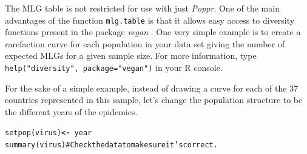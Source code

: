 \documentclass[letterpaper]{article}\usepackage[]{graphicx}\usepackage[]{color}
\makeatletter
\newcommand{\hlcom}[1]{\textcolor[rgb]{1,0.502,0}{#1}}%
\newcommand{\hlopt}[1]{\textcolor[rgb]{1,0,0.502}{\textbf{#1}}}%
\newcommand{\hlstd}[1]{\textcolor[rgb]{0,0,0}{#1}}%
\newcommand{\hlkwb}[1]{\textcolor[rgb]{0.502,0.502,0.753}{\textbf{#1}}}%
\newcommand{\hlkwd}[1]{\textcolor[rgb]{0,0.267,0.4}{#1}}%
\newenvironment{kframe}{%
 \def\at@end@of@kframe{}%
 \ifinner\ifhmode%
  \def\at@end@of@kframe{\end{minipage}}%
  \begin{minipage}{\columnwidth}%
 \fi\fi%
 \def\FrameCommand##1{\hskip\@totalleftmargin \hskip-\fboxsep
 \colorbox{shadecolor}{##1}\hskip-\fboxsep
     \hskip-\linewidth \hskip-\@totalleftmargin \hskip\columnwidth}%
 \MakeFramed {\advance\hsize-\width
   \@totalleftmargin\z@ \linewidth\hsize
   \@setminipage}}%
 {\par\unskip\endMakeFramed%
 \at@end@of@kframe}
\newenvironment{knitrout}{}{} %
\newcommand{\Poppr}{\textit{Poppr}}
\makeatother
\begin{document}
The MLG table is not restricted for use with just \Poppr{}. One of the main advantages of the function \texttt{mlg.table} is that it allows easy access to diversity functions present in the package \textit{vegan} \cite{vegan}. One very simple example is to create a rarefaction curve for each population in your data set giving the number of expected MLGs for a given sample size. For more information, type \texttt{help("diversity", package="vegan")} in your R console.

For the sake of a simple example, instead of drawing a curve for each of the 37 countries represented in this sample, let's change the population structure to be the different years of the epidemics. 
\begin{knitrout}\footnotesize
{}\color{fgcolor}\begin{kframe}
\begin{alltt}
\hlkwd{setpop}\hlstd{(virus)} \hlkwb{<-} \hlopt{~}\hlstd{year}
\hlkwd{summary}\hlstd{(virus)}  \hlcom{# Check the data to make sure it's correct.}
\end{alltt}
\end{kframe}
\end{knitrout}
\end{document}
